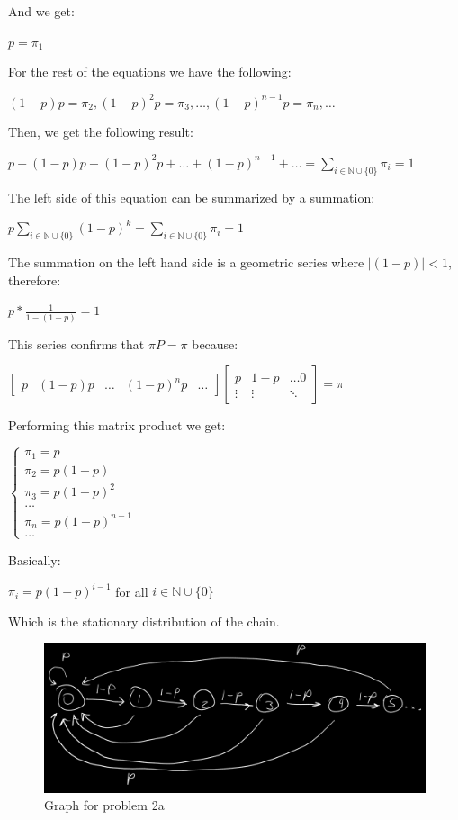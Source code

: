 \documentclass[]{article}
\begin{document}
And we get:

\(p = \pi_{1}\)

For the rest of the equations we have the following:

\((1 - p)p = \pi_{2}, (1 - p)^{2} p = \pi_{3}, \dots, (1 - p)^{n-1} p = \pi_{n}, \dots\)

Then, we get the following result:

\(p + (1-p)p + (1-p)^{2} p + \dots + (1-p)^{n-1} + \dots = \sum_{i \in \mathbb{N} \cup \{0\}} \pi_{i} = 1\)

The left side of this equation can be summarized by a summation:

\(p \sum_{i \in \mathbb{N} \cup \{0\}} (1-p)^{k} = \sum_{i \in \mathbb{N} \cup \{0\}} \pi_{i} = 1\)

The summation on the left hand side is a geometric series where
\(|(1-p)| < 1\), therefore:

\(p * \frac{1}{1 - (1 - p)} = 1\)

This series confirms that \(\pi P = \pi\) because:

\(\begin{bmatrix} p & (1 - p)p & \dots & (1 - p)^{n} p & \dots \end{bmatrix} \begin{bmatrix} p & 1-p & \dots 0 \\ \vdots & \vdots & \ddots \end{bmatrix} = \pi\)

Performing this matrix product we get:

\(\begin{cases} \pi_{1} = p \\ \pi_{2} = p (1-p) \\ \pi_{3} = p (1-p)^{2} \\ \dots \\ \pi_{n} = p (1-p)^{n-1} \\ \dots \end{cases}\)

Basically:

\(\pi_{i} = p (1-p)^{i-1}\) for all \(i \in \mathbb{N} \cup \{0\}\)

Which is the stationary distribution of the chain.

\begin{figure}
\centering
\includegraphics{./grafo2.png}
\caption{Graph for problem 2a}
\end{figure}
\end{document}
